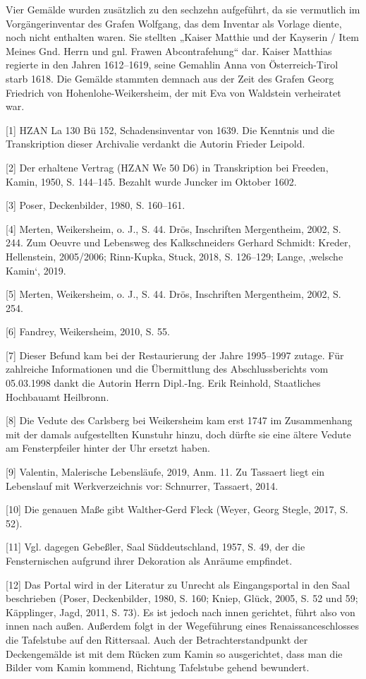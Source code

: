 \documentclass[
  a4paper,
  openany]{book}
\begin{document}
Vier Gemälde wurden zusätzlich zu den sechzehn aufgeführt, da sie
vermutlich im Vorgängerinventar des Grafen Wolfgang, das dem Inventar
als Vorlage diente, noch nicht enthalten waren. Sie stellten „Kaiser
Matthie und der Kayserin / Item Meines Gnd. Herrn und gnl. Frawen
Abcontrafehung`` dar. Kaiser Matthias regierte in den Jahren 1612--1619,
seine Gemahlin Anna von Österreich-Tirol starb 1618. Die Gemälde
stammten demnach aus der Zeit des Grafen Georg Friedrich von
Hohenlohe-Weikersheim, der mit Eva von Waldstein verheiratet war.

{[}1{]} HZAN La 130 Bü 152, Schadensinventar von 1639. Die Kenntnis und
die Transkription dieser Archivalie verdankt die Autorin Frieder
Leipold.

{[}2{]} Der erhaltene Vertrag (HZAN We 50 D6) in Transkription bei
Freeden, Kamin, 1950, S. 144--145. Bezahlt wurde Juncker im Oktober
1602.

{[}3{]} Poser, Deckenbilder, 1980, S. 160--161.

{[}4{]} Merten, Weikersheim, o. J., S. 44. Drös, Inschriften
Mergentheim, 2002, S. 244. Zum Oeuvre und Lebensweg des Kalkschneiders
Gerhard Schmidt: Kreder, Hellenstein, 2005/2006; Rinn-Kupka, Stuck,
2018, S. 126--129; Lange, ‚welsche Kamin`, 2019.

{[}5{]} Merten, Weikersheim, o. J., S. 44. Drös, Inschriften
Mergentheim, 2002, S. 254.

{[}6{]} Fandrey, Weikersheim, 2010, S. 55.

{[}7{]} Dieser Befund kam bei der Restaurierung der Jahre 1995--1997
zutage. Für zahlreiche Informationen und die Übermittlung des
Abschlussberichts vom 05.03.1998 dankt die Autorin Herrn Dipl.-Ing. Erik
Reinhold, Staatliches Hochbauamt Heilbronn.

{[}8{]} Die Vedute des Carlsberg bei Weikersheim kam erst 1747 im
Zusammenhang mit der damals aufgestellten Kunstuhr hinzu, doch dürfte
sie eine ältere Vedute am Fensterpfeiler hinter der Uhr ersetzt haben.

{[}9{]} Valentin, Malerische Lebensläufe, 2019, Anm. 11. Zu Tassaert
liegt ein Lebenslauf mit Werkverzeichnis vor: Schnurrer, Tassaert, 2014.

{[}10{]} Die genauen Maße gibt Walther-Gerd Fleck (Weyer, Georg Stegle,
2017, S. 52).

{[}11{]} Vgl. dagegen Gebeßler, Saal Süddeutschland, 1957, S. 49, der
die Fensternischen aufgrund ihrer Dekoration als Anräume empfindet.

{[}12{]} Das Portal wird in der Literatur zu Unrecht als Eingangsportal
in den Saal beschrieben (Poser, Deckenbilder, 1980, S. 160; Kniep,
Glück, 2005, S. 52 und 59; Käpplinger, Jagd, 2011, S. 73). Es ist jedoch
nach innen gerichtet, führt also von innen nach außen. Außerdem folgt in
der Wegeführung eines Renaissanceschlosses die Tafelstube auf den
Rittersaal. Auch der Betrachterstandpunkt der Deckengemälde ist mit dem
Rücken zum Kamin so ausgerichtet, dass man die Bilder vom Kamin kommend,
Richtung Tafelstube gehend bewundert.
\end{document}
